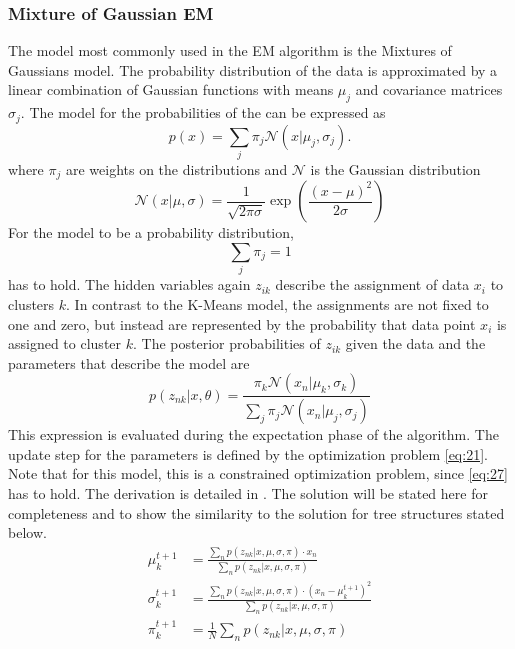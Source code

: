 \subsubsection{Mixture of Gaussian EM}
\label{sec:mixture-gaussian-em}
The model most commonly used in the EM algorithm is the Mixtures of Gaussians model.
The probability distribution of the data is approximated by a linear combination of Gaussian functions with means $\mu_j$ and covariance matrices $\sigma_j$.
The model for the probabilities of the can be expressed as
\begin{equation}
  \label{eq:22}
  p(x) = \sum_{j}\pi_j\mathcal{N}(x|\mu_j,\sigma_j). 
\end{equation}
where $\pi_j$ are weights on the distributions and $\mathcal{N}$ is the Gaussian distribution
\begin{equation}
  \label{eq:25}
  \mathcal{N}(x|\mu,\sigma) = \frac{1}{\sqrt{2\pi\sigma}}\exp\left(\frac{(x-\mu)^2}{2\sigma}\right)
\end{equation}
For the model to be a probability distribution,
\begin{equation}
  \label{eq:27}
  \sum_j\pi_j = 1
\end{equation}
has to hold.
The hidden variables again $z_{ik}$ describe the  assignment of data $x_i$ to clusters $k$.
In contrast to the K-Means model, the assignments are not fixed to one and zero, but instead are represented by the probability that data point $x_i$ is assigned to cluster $k$.
The posterior probabilities of $z_{ik}$ given the data and the parameters that describe the model are 
\begin{equation}
  \label{eq:26}
  p(z_{nk}|x, \theta) = \frac{\pi_k\mathcal{N}(x_n|\mu_k,\sigma_k)}{\sum_j\pi_j\mathcal{N}(x_n|\mu_j, \sigma_j)}
\end{equation}
This expression is evaluated during the expectation phase of the algorithm.
The update step for the parameters is defined by the optimization problem \eqref{eq:21}.
Note that for this model, this is a constrained optimization problem, since \eqref{eq:27} has to hold.
The derivation is detailed in \cite{Bishop2006}.
The solution will be stated here for completeness and to show the similarity to the solution for tree structures stated below.
\begin{align}
  \label{eq:29}
  \mu_k^{t+1} &= \frac{\sum_np(z_{nk}|x, \mu, \sigma, \pi)\cdot x_n}{\sum_np(z_{nk}|x, \mu, \sigma, \pi)}\\
  \sigma_k^{t+1}&= \frac{\sum_np(z_{nk}|x, \mu, \sigma, \pi)\cdot (x_n-\mu_k^{t+1})^2}{\sum_np(z_{nk}|x, \mu, \sigma, \pi)}\\
  \pi_k^{t+1}&= \frac{1}{N}\sum_{n}p(z_{nk}|x, \mu, \sigma, \pi)
\end{align}

